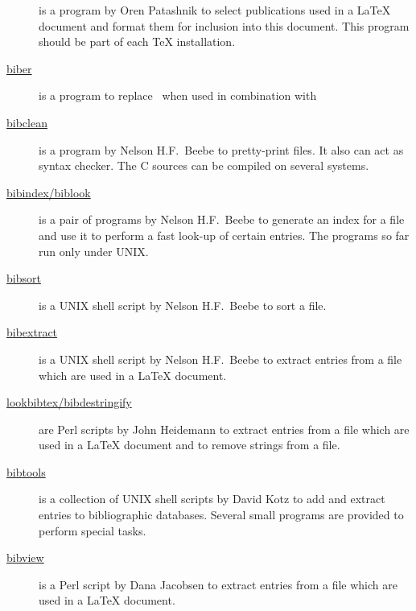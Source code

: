 \documentclass[11pt,a4paper]{scrbook}
\begin{document}
\begin{description}
\item
  [\href{https://www.ctan.org/pkg/bibtex}{\BibTeX}] is
  a program by Oren Patashnik to select publications used in a \LaTeX{}
  document and format them for inclusion into this document. This program
  should be part of each \TeX{} installation.

\item
  [\href{https://www.ctan.org/pkg/biber}{biber}] is a program to replace
  \BibTeX\ when used in combination with
  \href{https://www.ctan.org/pkg/biblatex/}{\bibLaTeX}
  
\item
  [\href{https://www.ctan.org/pkg/bibclean}{bibclean}]
  is a program by Nelson H.F.~Beebe to pretty-print \BibTeX{} files. It also
  can act as syntax checker. The C sources can be compiled on several systems.
  
\item
  [\href{https://www.ctan.org/pkg/biblook}{bibindex/biblook}]
  is a pair of programs by Nelson H.F.~Beebe to generate an index for a
  \BibTeX{} file and use it to perform a fast look-up of certain entries. The
  programs so far run only under UNIX.
    
\item
  [\href{https://www.ctan.org/pkg/bibsort}{bibsort}]
  is a UNIX shell script by Nelson H.F.~Beebe to sort a \BibTeX{} file.
  
\item
  [\href{https://www.ctan.org/pkg/bibextract}{bibextract}]
  is a UNIX shell script by Nelson H.F.~Beebe to extract entries from a
  \BibTeX{} file which are used in a \LaTeX{} document.
    
\item
  [\href{https://www.ctan.org/pkg/lookbibtex}{lookbibtex/bibdestringify}]
    are Perl scripts by John Heidemann to extract entries from a \BibTeX{}
    file which are used in a \LaTeX{} document and to remove strings from a
    \BibTeX{} file.
    
\item
  [\href{https://www.ctan.org/pkg/bibtools}{bibtools}]
  is a collection of UNIX shell scripts by David Kotz to add and extract
  entries to bibliographic databases. Several small programs are provided to
  perform special tasks.
    
\item
  [\href{https://www.ctan.org/pkg/bibview}{bibview}]
  is a Perl script by Dana Jacobsen to extract entries from a \BibTeX{} file
  which are used in a \LaTeX{} document.
    

\end{description}
\end{document}
